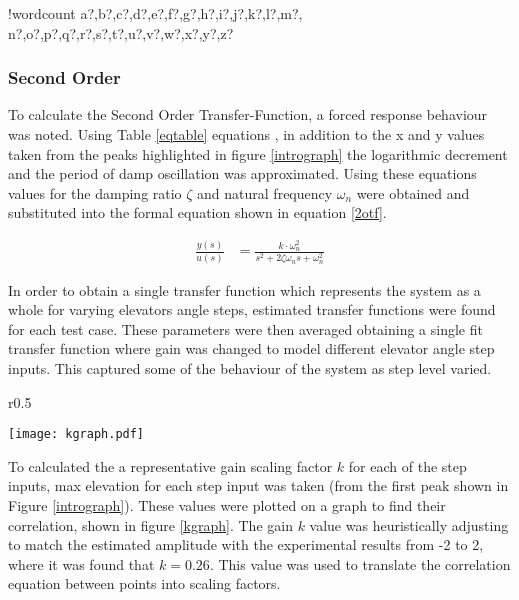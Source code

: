 \documentclass[11pt]{article}
\newcounter{words}
\newenvironment{counted}{%
  \setcounter{words}{0}
  \SearchList!{wordcount}{\stepcounter{words}}
    {a?,b?,c?,d?,e?,f?,g?,h?,i?,j?,k?,l?,m?,
    n?,o?,p?,q?,r?,s?,t?,u?,v?,w?,x?,y?,z?}
  \UndoBoundary{'}
  \SearchOrder{p;}}{%
  \StopSearching}
\begin{document}
\begin{counted}
\subsubsection{Second Order}\label{second-order}

To calculate the Second Order Transfer-Function, a forced response
behaviour was noted. Using Table \ref{eqtable} equations \cite{vibnote}
\cite{vibnote2}, in addition to the x and y values taken from the peaks
highlighted in figure \ref{intrograph} the logarithmic decrement and the
period of damp oscillation was approximated. Using these equations
values for the damping ratio \(\zeta\) and natural frequency
\(\omega_n\) were obtained and substituted into the formal equation
shown in equation \ref{2otf}.

\begin{align}
\frac{ y(s) }{ u(s) } &=\frac{ k\cdot \omega_{ n }^{ 2 } }{ s^{ 2 }+2\zeta \omega_{ n }s+\omega_{ n }^{ 2 } } \label{2otf}
\end{align}

In order to obtain a single transfer function which represents the
system as a whole for varying elevators angle steps, estimated transfer
functions were found for each test case. These parameters were then
averaged obtaining a single fit transfer function where gain was changed
to model different elevator angle step inputs. This captured some of the
behaviour of the system as step level varied.

\begin{wrapfigure}{r}{0.5\textwidth}
  \begin{center}
  \vspace{-20pt}
\texttt{[image: kgraph.pdf]}  
\end{center}
\caption{Graph Finding the Gain For Each Step Input}
\label{kgraph}
  \vspace{-15pt}
\end{wrapfigure}

To calculated the a representative gain scaling factor \(k\) for each of
the step inputs, max elevation for each step input was taken (from the
first peak shown in Figure \ref{intrograph}). These values were plotted
on a graph to find their correlation, shown in figure \ref{kgraph}. The
gain \(k\) value was heuristically adjusting to match the estimated
amplitude with the experimental results from -2 to 2, where it was found
that \(k = 0.26\). This value was used to translate the correlation
equation between points into scaling factors.


\end{counted}
\end{document}
